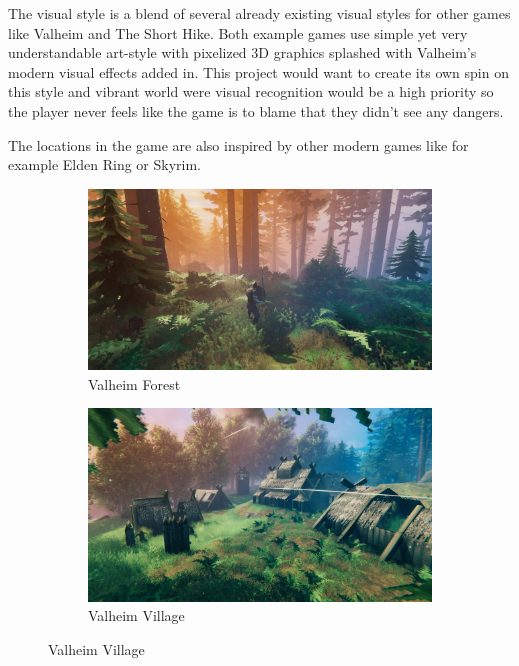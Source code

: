 \documentclass[a4paper,10pt,english]{article}
\begin{document}
The visual style is a blend of several already existing visual styles for other games like Valheim and The Short Hike. Both example games use simple yet very understandable art-style with pixelized 3D graphics splashed with Valheim's modern visual effects added in. This project would want to create its own spin on this style and vibrant world were visual recognition would be a high priority so the player never feels like the game is to blame that they didn't see any dangers.

The locations in the game are also inspired by other modern games like for example Elden Ring or Skyrim.

\begin{figure}[h]

\centering

\begin{subfigure}{0.49\linewidth}
\includegraphics[width=1\linewidth]{Valheim1.jpg}
\caption{Valheim Forest}
\label{fig:valheim forest}
\end{subfigure}\hfill
%
\begin{subfigure}{0.49\linewidth}
\includegraphics[width=1\linewidth]{Valheim2.jpg}
\caption{Valheim Village}
\label{fig:valheim village}
\end{subfigure}\hfill

\end{figure}
\end{document}

